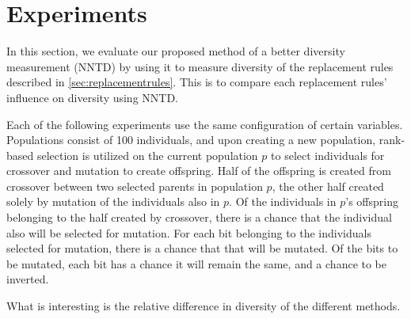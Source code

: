\section{Experiments}
In this section, we evaluate our proposed method of a better diversity measurement (NNTD) by using it to measure diversity of the replacement rules described in \cref{sec:replacementrules}. This is to compare each replacement rules' influence on diversity using NNTD.

Each of the following experiments use the same configuration of certain variables. Populations consist of \num{100} individuals, and upon creating a new population, rank-based selection is utilized on the current population $p$ to select individuals for crossover and mutation to create offspring. Half of the offspring is created from crossover between two selected parents in population $p$, the other half created solely by mutation of the individuals also in $p$. Of the individuals in $p$'s offspring belonging to the half created by crossover, there is a  chance that the individual also will be selected for mutation. For each bit belonging to the individuals selected for mutation, there is a  chance that that will be mutated. Of the bits to be mutated, each bit has a  chance it will remain the same, and a  chance to be inverted.

What is interesting is the relative difference in diversity of the different methods.



